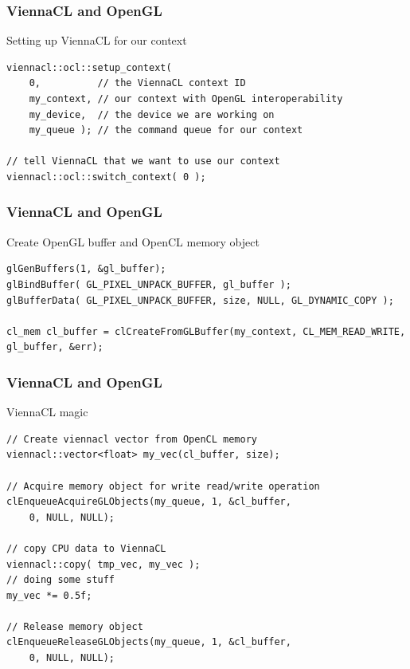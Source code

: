 \begin{frame}[fragile]
\frametitle{ViennaCL and OpenGL}

\begin{block}{Setting up ViennaCL for our context}
  \begin{lstlisting}
viennacl::ocl::setup_context( 
    0,          // the ViennaCL context ID
    my_context, // our context with OpenGL interoperability
    my_device,  // the device we are working on
    my_queue ); // the command queue for our context
    
// tell ViennaCL that we want to use our context
viennacl::ocl::switch_context( 0 );
  \end{lstlisting}
\end{block}

\end{frame}




\begin{frame}[fragile]
\frametitle{ViennaCL and OpenGL}

\begin{block}{Create OpenGL buffer and OpenCL memory object}
  \begin{lstlisting}
glGenBuffers(1, &gl_buffer);
glBindBuffer( GL_PIXEL_UNPACK_BUFFER, gl_buffer );
glBufferData( GL_PIXEL_UNPACK_BUFFER, size, NULL, GL_DYNAMIC_COPY );

cl_mem cl_buffer = clCreateFromGLBuffer(my_context, CL_MEM_READ_WRITE, gl_buffer, &err);
  \end{lstlisting}
\end{block}

\end{frame}



\begin{frame}[fragile]
\frametitle{ViennaCL and OpenGL}

\begin{block}{ViennaCL magic}
  \begin{lstlisting}
// Create viennacl vector from OpenCL memory
viennacl::vector<float> my_vec(cl_buffer, size);

// Acquire memory object for write read/write operation
clEnqueueAcquireGLObjects(my_queue, 1, &cl_buffer,
    0, NULL, NULL);

// copy CPU data to ViennaCL
viennacl::copy( tmp_vec, my_vec );
// doing some stuff
my_vec *= 0.5f;

// Release memory object
clEnqueueReleaseGLObjects(my_queue, 1, &cl_buffer,
    0, NULL, NULL);
  \end{lstlisting}
\end{block}

\end{frame}



